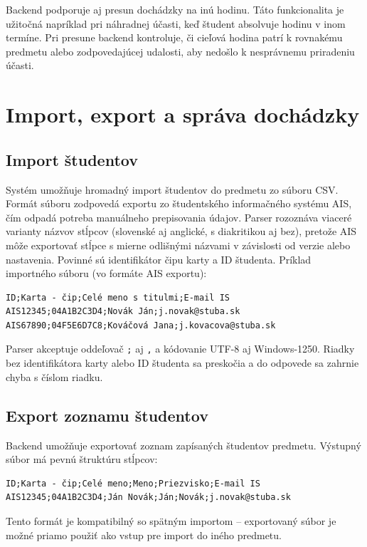 Backend podporuje aj presun dochádzky na inú hodinu. Táto funkcionalita je užitočná napríklad pri náhradnej účasti, keď študent absolvuje hodinu v inom termíne. Pri presune backend kontroluje, či cieľová hodina patrí k rovnakému predmetu alebo zodpovedajúcej udalosti, aby nedošlo k nesprávnemu priradeniu účasti.

\section{Import, export a správa dochádzky}
\label{sec:backend-export}

\subsection*{Import študentov}

Systém umožňuje hromadný import študentov do predmetu zo súboru CSV. Formát súboru zodpovedá exportu zo študentského informačného systému AIS, čím odpadá potreba manuálneho prepisovania údajov. Parser rozoznáva viaceré varianty názvov stĺpcov (slovenské aj anglické, s diakritikou aj bez), pretože AIS môže exportovať stĺpce s mierne odlišnými názvami v závislosti od verzie alebo nastavenia. Povinné sú identifikátor čipu karty a ID študenta. Príklad importného súboru (vo formáte AIS exportu):

\begin{verbatim}
ID;Karta - čip;Celé meno s titulmi;E-mail IS
AIS12345;04A1B2C3D4;Novák Ján;j.novak@stuba.sk
AIS67890;04F5E6D7C8;Kováčová Jana;j.kovacova@stuba.sk
\end{verbatim}

Parser akceptuje oddeľovač \texttt{;} aj \texttt{,} a kódovanie UTF-8 aj Windows-1250. Riadky bez identifikátora karty alebo ID študenta sa preskočia a do odpovede sa zahrnie chyba s číslom riadku.

\subsection*{Export zoznamu študentov}

Backend umožňuje exportovať zoznam zapísaných študentov predmetu. Výstupný súbor má pevnú štruktúru stĺpcov:

\begin{verbatim}
ID;Karta - čip;Celé meno;Meno;Priezvisko;E-mail IS
AIS12345;04A1B2C3D4;Ján Novák;Ján;Novák;j.novak@stuba.sk
\end{verbatim}

Tento formát je kompatibilný so spätným importom -- exportovaný súbor je možné priamo použiť ako vstup pre import do iného predmetu.

